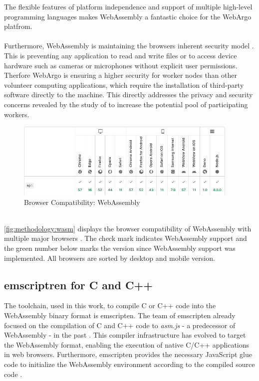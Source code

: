 The flexible features of platform independence and support of multiple high-level programming languages makes WebAssembly a fantastic choice for the WebArgo platfrom.
\\~\\
Furthermore, WebAssembly is maintaining the browsers inherent security model \cite{methodology:wasmW3C, methodology:wasm2, methodology:wasmdocu}. This is preventing any application to read and write ﬁles or to access device hardware such as cameras or microphones without explicit user permissions. Therfore WebArgo is ensuring a higher security for worker nodes than other volunteer computing applications, which require the installation of third-party software directly to the machine. This directly addresses the privacy and security concerns revealed by the study of \citeauthor{intro:volunteerStudy} \cite{intro:volunteerStudy} to increase the potential pool of participating workers.
\clearpage
\begin{figure}[htbp]
  \centering
  \includegraphics[width=0.95\textwidth]{gfx/figures/webassembly-browsercompability.png}
  \caption{Browser Compatibility: WebAssembly \cite{methodology:wasmdocu}}
  \label{fig:methodology:wasm}
\end{figure}
~\\
\autoref{fig:methodology:wasm} displays the browser compatibility of WebAssembly with multiple major browsers \cite{methodology:wasmdocu}. The check mark indicates WebAssembly support and the green number below marks the version since WebAssembly support was implemented. All browsers are sorted by desktop and mobile version. 

\subsection{emscriptren for C and C++}
\label{subsec:methodology:wasm:cpp}
The toolchain, used in this work, to compile C or C++ code into the WebAssembly binary format is emscripten. The team of emscripten already focused on the compilation of C and C++ code to \emph{asm.js} - a predecessor of WebAssembly - in the past \cite{methodology:emcc}. This compiler infrastructure has evolved to target the WebAssembly format, enabling the execution of native C/C++ applications in web browsers. Furthermore, emscripten provides the necessary JavaScript glue code to initialize the WebAssembly environment according to the compiled source code \cite{methodology:emcc}.

